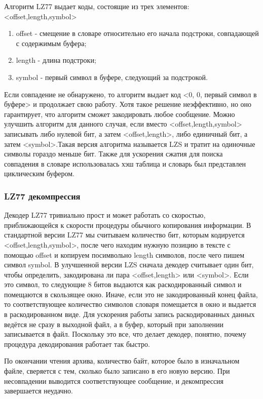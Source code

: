 \documentclass[12pt]{article}
\begin{document}
Алгоритм LZ77 выдает коды, состоящие из трех элементов:<offset,length,symbol>

\begin{enumerate}
	\item offset - смещение в словаре относительно его начала подстроки, совпадающей с содержимым буфера;
	\item length - длина подстроки;
	\item symbol - первый символ в буфере, следующий за подстрокой.
\end{enumerate}

Если совпадение не обнаружено, то алгоритм выдает код <0, 0, первый символ в буфере> и продолжает свою работу. Хотя такое решение неэффективно, но оно гарантирует, что алгоритм сможет закодировать любое сообщение.
Можно улучшить алгоритм для данного случая, если вместо <offset,length,symbol> записывать либо нулевой бит, а затем <offset,length>, либо единичный бит, а затем <symbol>.Такая версия алгоритма называется LZS и тратит на одиночные символы гораздо меньше бит.
Также для ускорения сжатия для поиска совпадения в словаре использовалась хэш таблица и словарь был представлен циклическим буфером.

\subsubsection*{LZ77 декомпрессия}

Декодер LZ77 тривиально прост и может работать со скоростью, приближающейся к скорости процедуры обычного копирования информации.
В стандартной версии LZ77 мы считываем количество бит, которым кодируется <offset,length,symbol>, после чего находим нужную позицию в тексте с помощью offset и копируем посимвольно length символов, после чего пишем символ symbol.
В улучшенной версии LZS сначала декодер считывает один бит, чтобы определить, закодирована ли пара <offset,length> или <symbol>. Если это символ, то следующие 8 битов выдаются как раскодированный символ и помещаются в скользящее окно. Иначе, если это не закодированный конец файла, то соответствующее количество символов словаря помещается в окно и выдается в раскодированном виде.
Для ускорения работы запись раскодированных данных ведётся не сразу в выходной файл, а в буфер, который при заполнении записывается в файл.
Поскольку это все, что делает декодер, понятно, почему процедура декодирования работает так быстро.

По окончании чтения архива, количество байт, которое было в изначальном файле, сверяется с тем, сколько было записано в его новую версию. При несовпадении выводится соответствующее сообщение, и декомпрессия завершается неудачно.
\end{document}

